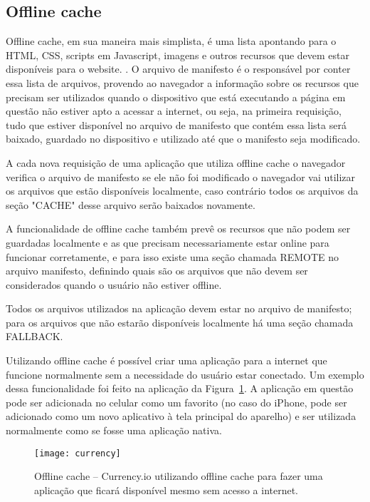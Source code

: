 \subsection{Offline cache}

Offline cache, em sua maneira mais simplista, é uma lista apontando
para o HTML, CSS, scripts em Javascript, imagens e outros recursos que devem
estar disponíveis para o website. \cite{pilgrim2010html5}. O arquivo de
manifesto é o responsável por conter essa lista de arquivos, provendo
ao navegador a informação sobre os recursos que
precisam ser utilizados quando o dispositivo que está executando a
página em questão não estiver apto a acessar a internet, ou seja,
na primeira requisição, tudo que estiver disponível no arquivo de manifesto
que contém essa lista será baixado, guardado no dispositivo e utilizado até
que o manifesto seja modificado.

A cada nova requisição de uma aplicação que utiliza offline cache o
navegador verifica o arquivo de manifesto se ele não foi modificado
o navegador vai utilizar os arquivos que estão disponíveis localmente,
caso contrário todos os arquivos da seção "CACHE" desse arquivo serão baixados novamente.

A funcionalidade de offline cache também prevê os recursos que não
podem ser guardadas localmente e as que precisam
necessariamente estar online para funcionar corretamente, e para isso
existe uma seção chamada REMOTE no arquivo manifesto, definindo quais
são os arquivos que não devem ser considerados quando o usuário não
estiver offline.

Todos os arquivos utilizados na aplicação devem estar no arquivo de
manifesto; para os arquivos que não estarão disponíveis localmente há
uma seção chamada FALLBACK.

Utilizando offline cache é possível criar uma aplicação para a
internet que funcione normalmente sem a necessidade do usuário estar
conectado. Um exemplo dessa funcionalidade foi feito na aplicação da
Figura~\ref{img:currency}. A aplicação em questão pode ser adicionada
no celular como um favorito (no caso do iPhone, pode ser adicionado
como um novo aplicativo à tela principal do aparelho) e ser utilizada
normalmente como se fosse uma aplicação nativa.

\begin{figure}[H]
  \centering
	\texttt{[image: currency]}
  \caption{Offline cache {--} Currency.io utilizando offline cache
  para fazer uma aplicação que ficará disponível mesmo sem acesso a
  internet.}
  \label{img:currency}
\end{figure}

